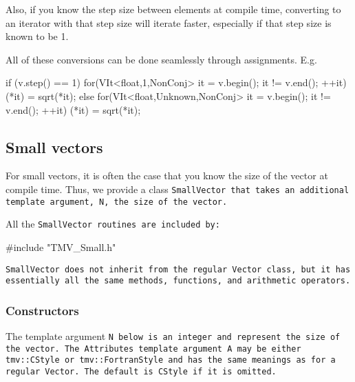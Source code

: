 Also, if you know the step size between elements at compile time, converting to 
an iterator with that step size will iterate faster, especially if that step size is known to be 1.

All of these conversions can be done seamlessly through assignments.  E.g.
\begin{tmvcode}
if (v.step() == 1) {
    for(VIt<float,1,NonConj> it = v.begin(); it != v.end(); ++it)
        (*it) = sqrt(*it);
} else {
    for(VIt<float,Unknown,NonConj> it = v.begin(); it != v.end(); ++it)
        (*it) = sqrt(*it);
}
\end{tmvcode}

\subsection{Small vectors}
\label{SmallVector}

For small vectors, it is often the case that you know the size of the vector
at compile time.  Thus, we provide a class \tt{SmallVector} that takes an
additional template argument, \tt{N}, the size of the vector.

All the \tt{SmallVector} routines are included by:
\begin{tmvcode}
#include "TMV_Small.h"
\end{tmvcode}
\tt{SmallVector} does not inherit from the regular \tt{Vector} class, but it has 
essentially all the same methods, functions, and arithmetic operators. 

\subsubsection{Constructors}
\label{SmallVector_Constructors}

The template argument \tt{N} below is an integer and
represent the size of the vector.
The Attributes template argument 
 \tt{A} may be either \tt{tmv::CStyle} or
\tt{tmv::FortranStyle} and has the same meanings as 
for a regular \tt{Vector}. The default is \tt{CStyle} if it is omitted.

